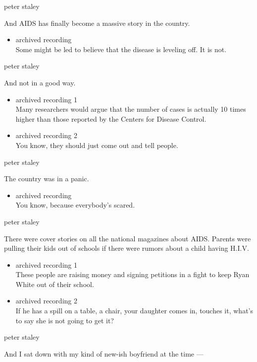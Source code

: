 peter staley

And AIDS has finally become a massive story in the country.

\begin{itemize}
\tightlist
\item
  archived recording\\
  Some might be led to believe that the disease is leveling off. It is
  not.
\end{itemize}

peter staley

And not in a good way.

\begin{itemize}
\item
  archived recording 1\\
  Many researchers would argue that the number of cases is actually 10
  times higher than those reported by the Centers for Disease Control.
\item
  archived recording 2\\
  You know, they should just come out and tell people.
\end{itemize}

peter staley

The country was in a panic.

\begin{itemize}
\tightlist
\item
  archived recording\\
  You know, because everybody's scared.
\end{itemize}

peter staley

There were cover stories on all the national magazines about AIDS.
Parents were pulling their kids out of schools if there were rumors
about a child having H.I.V.

\begin{itemize}
\item
  archived recording 1\\
  These people are raising money and signing petitions in a fight to
  keep Ryan White out of their school.
\item
  archived recording 2\\
  If he has a spill on a table, a chair, your daughter comes in, touches
  it, what's to say she is not going to get it?
\end{itemize}

peter staley

And I sat down with my kind of new-ish boyfriend at the time ---

